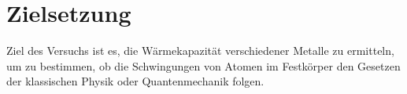 
\section{Zielsetzung}
\label{sec:Zielsetzung}

Ziel des Versuchs ist es, die Wärmekapazität verschiedener Metalle zu ermitteln, um zu bestimmen, ob die Schwingungen von Atomen im Festkörper den Gesetzen der klassischen Physik oder Quantenmechanik folgen.

